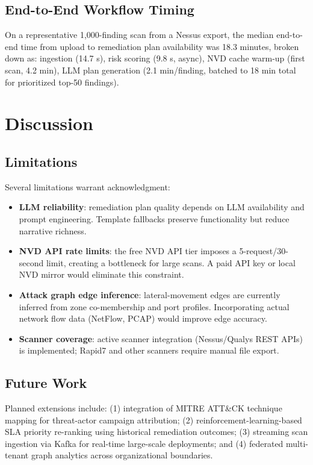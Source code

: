 \documentclass[conference]{IEEEtran}
\begin{document}
\subsection{End-to-End Workflow Timing}

On a representative 1,000-finding scan from a Nessus export, the median end-to-end time from upload to remediation plan availability was 18.3 minutes, broken down as: ingestion (14.7 s), risk scoring (9.8 s, async), NVD cache warm-up (first scan, 4.2 min), LLM plan generation (2.1 min/finding, batched to 18 min total for prioritized top-50 findings).

\section{Discussion}

\subsection{Limitations}

Several limitations warrant acknowledgment:

\begin{itemize}
  \item \textbf{LLM reliability}: remediation plan quality depends on LLM availability and prompt engineering. Template fallbacks preserve functionality but reduce narrative richness.
  \item \textbf{NVD API rate limits}: the free NVD API tier imposes a 5-request/30-second limit, creating a bottleneck for large scans. A paid API key or local NVD mirror would eliminate this constraint.
  \item \textbf{Attack graph edge inference}: lateral-movement edges are currently inferred from zone co-membership and port profiles. Incorporating actual network flow data (NetFlow, PCAP) would improve edge accuracy.
  \item \textbf{Scanner coverage}: active scanner integration (Nessus/Qualys REST APIs) is implemented; Rapid7 and other scanners require manual file export.
\end{itemize}

\subsection{Future Work}

Planned extensions include: (1) integration of MITRE ATT\&CK technique mapping for threat-actor campaign attribution; (2) reinforcement-learning-based SLA priority re-ranking using historical remediation outcomes; (3) streaming scan ingestion via Kafka for real-time large-scale deployments; and (4) federated multi-tenant graph analytics across organizational boundaries.
\end{document}
